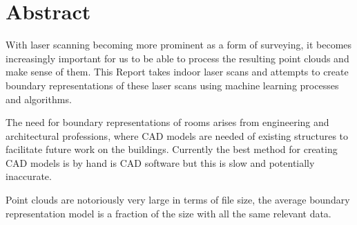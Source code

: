 \chapter*{Abstract}


	With laser scanning becoming more prominent as a form of surveying, it becomes increasingly important for us to be able to process the resulting point clouds and make sense of them. This Report takes indoor laser scans and attempts to create boundary representations of these laser scans using machine learning processes and algorithms.
	
	The need for boundary representations of rooms arises from engineering and architectural professions, where CAD models are needed of existing structures to facilitate future work on the buildings. Currently the best method for creating CAD models is by hand is CAD software but this is slow and potentially inaccurate.
	
	Point clouds are notoriously very large in terms of file size, the average boundary representation model is a fraction of the size with all the same relevant data.
	